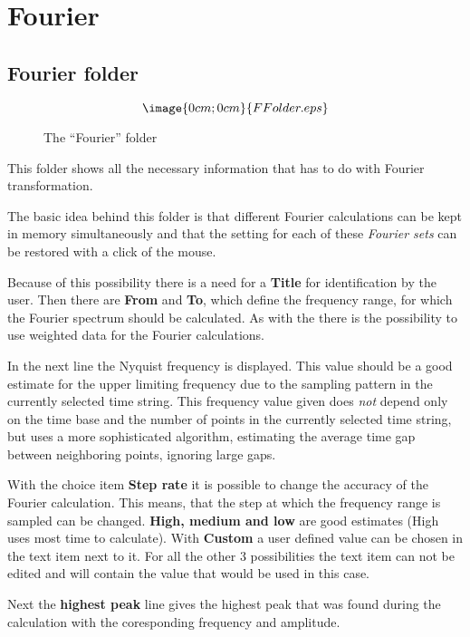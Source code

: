 \section{Fourier}%
\label{fourier.detailed}

\subsection{Fourier folder}%
\label{fourier.folder}

\begin{figure}[h]
$$\image{0cm;0cm}{FFolder.eps}$$
\caption{The ``Fourier'' folder}
\end{figure}

This folder shows all the necessary information that has to do with 
Fourier transformation.

The basic idea behind this folder is that different Fourier calculations 
can be kept in memory simultaneously and that the setting for each of these 
{\it Fourier sets} can be restored with a click of the mouse.

Because of this possibility there is a need for a {\bf Title} for 
identification by the user.
Then there are {\bf From} and {\bf To}, which define the frequency range,
for which the Fourier spectrum should be calculated.
As with the  there is the possibility
to use weighted data for the Fourier calculations.

 In the next line the Nyquist frequency
is displayed. This value should be a good
estimate for the upper limiting frequency due to the sampling pattern in
the currently selected time string.
This frequency value given does {\it not} depend only on the time base 
and the number of points in the currently selected time string, 
but uses a more sophisticated algorithm, estimating the average 
time gap between neighboring points, ignoring large gaps.

With the choice item {\bf Step rate} it is possible to change the accuracy 
of the Fourier calculation. This means, that the step at which the frequency 
range is sampled can be changed. {\bf High, medium and low} are good 
estimates (High uses most time to calculate).
With {\bf Custom} a user defined value can be chosen 
in the text item next to it.
For all the other 3 possibilities the text item can not be edited and
will contain the value that would be used in this case.

Next the {\bf highest peak} line gives the highest peak that was 
found during the calculation with the coresponding frequency and amplitude.

